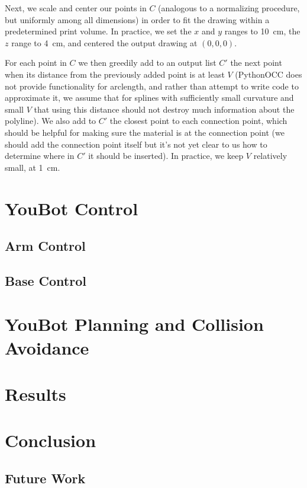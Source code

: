 \documentclass[conference]{acmsiggraph}
\begin{document}
Next, we scale and center our points in $C$ (analogous to a normalizing procedure, but uniformly among all dimensions) in order to fit the drawing within a predetermined print volume.  In practice, we set the $x$ and $y$ ranges to 10~cm, the $z$ range to 4~cm, and centered the output drawing at $(0, 0, 0)$.

For each point in $C$ we then greedily add to an output list $C'$ the next point when its distance from the previously added point is at least $V$ (PythonOCC does not provide functionality for arclength, and rather than attempt to write code to approximate it, we assume that for splines with sufficiently small curvature and small $V$ that using this distance should not destroy much information about the polyline).  We also add to $C'$ the closest point to each connection point, which should be helpful for making sure the material is at the connection point (we should add the connection point itself but it's not yet clear to us how to determine where in $C'$ it should be inserted).  In practice, we keep $V$ relatively small, at 1~cm.



\section{YouBot Control}

\subsection{Arm Control}

\subsection{Base Control}

\section{YouBot Planning and Collision Avoidance}

\section{Results}

\section{Conclusion}

\subsection{Future Work}
\end{document}
